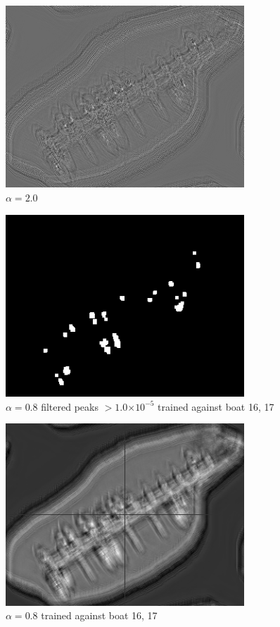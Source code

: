 \documentclass[12pt]{article}
\providecommand{\e}[1]{\ensuremath{\times 10^{#1}}}
\begin{document}
\begin{figure}
\centering
\includegraphics[width=0.80\textwidth]{v2/boats_a20.png}
\caption{\(\alpha=2.0\)}
\label{a20}
\end{figure}

\begin{figure}
\centering
\includegraphics[width=0.80\textwidth]{v2/boats_a08_missing_peak.png}
\caption{\(\alpha=0.8\) filtered peaks \(> 1.0\e{-5}\) trained against boat 16, 17}
\label{a08missingpeak}
\end{figure}

\begin{figure}
\centering
\includegraphics[width=0.80\textwidth]{v2/boats_a08_missing.png}
\caption{\(\alpha=0.8\) trained against boat 16, 17}
\label{a08missing}
\end{figure}
\end{document}

